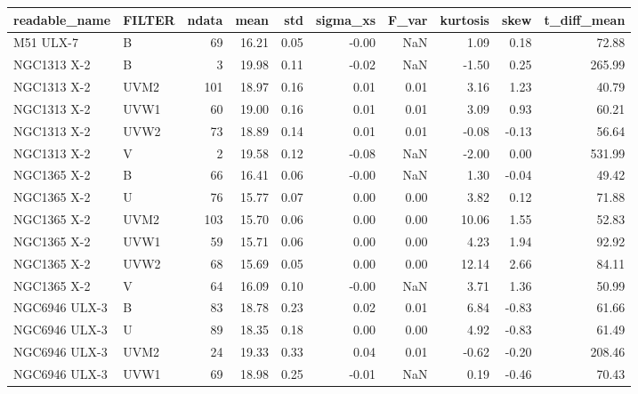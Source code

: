 \begin{tabular}{llrrrrrrrr}
\toprule
     readable\_name & FILTER &  ndata &  mean &  std &  sigma\_xs &  F\_var &  kurtosis &  skew &  t\_diff\_mean \\
\midrule
         M51 ULX-7 &      B &     69 & 16.21 & 0.05 &     -0.00 &    NaN &      1.09 &  0.18 &        72.88 \\
       NGC1313 X-2 &      B &      3 & 19.98 & 0.11 &     -0.02 &    NaN &     -1.50 &  0.25 &       265.99 \\
       NGC1313 X-2 &   UVM2 &    101 & 18.97 & 0.16 &      0.01 &   0.01 &      3.16 &  1.23 &        40.79 \\
       NGC1313 X-2 &   UVW1 &     60 & 19.00 & 0.16 &      0.01 &   0.01 &      3.09 &  0.93 &        60.21 \\
       NGC1313 X-2 &   UVW2 &     73 & 18.89 & 0.14 &      0.01 &   0.01 &     -0.08 & -0.13 &        56.64 \\
       NGC1313 X-2 &      V &      2 & 19.58 & 0.12 &     -0.08 &    NaN &     -2.00 &  0.00 &       531.99 \\
       NGC1365 X-2 &      B &     66 & 16.41 & 0.06 &     -0.00 &    NaN &      1.30 & -0.04 &        49.42 \\
       NGC1365 X-2 &      U &     76 & 15.77 & 0.07 &      0.00 &   0.00 &      3.82 &  0.12 &        71.88 \\
       NGC1365 X-2 &   UVM2 &    103 & 15.70 & 0.06 &      0.00 &   0.00 &     10.06 &  1.55 &        52.83 \\
       NGC1365 X-2 &   UVW1 &     59 & 15.71 & 0.06 &      0.00 &   0.00 &      4.23 &  1.94 &        92.92 \\
       NGC1365 X-2 &   UVW2 &     68 & 15.69 & 0.05 &      0.00 &   0.00 &     12.14 &  2.66 &        84.11 \\
       NGC1365 X-2 &      V &     64 & 16.09 & 0.10 &     -0.00 &    NaN &      3.71 &  1.36 &        50.99 \\
     NGC6946 ULX-3 &      B &     83 & 18.78 & 0.23 &      0.02 &   0.01 &      6.84 & -0.83 &        61.66 \\
     NGC6946 ULX-3 &      U &     89 & 18.35 & 0.18 &      0.00 &   0.00 &      4.92 & -0.83 &        61.49 \\
     NGC6946 ULX-3 &   UVM2 &     24 & 19.33 & 0.33 &      0.04 &   0.01 &     -0.62 & -0.20 &       208.46 \\
     NGC6946 ULX-3 &   UVW1 &     69 & 18.98 & 0.25 &     -0.01 &    NaN &      0.19 & -0.46 &        70.43 \\

\end{tabular}
